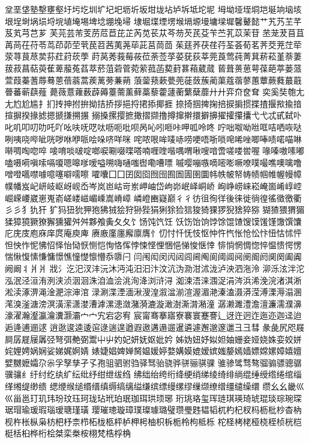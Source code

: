 坌垩垡塾墼壅壑圩圬圪圳圹圮圯坜圻坂坩垅坫垆坼坻坨坭
坶坳垭垤垌垲埏垧垴垓垠埕埘埚埙埒垸埴埯埸埤埝堋堍埽
埭堀堞堙塄堠塥塬墁墉墚墀馨鼙懿艹艽艿芏芊芨芄芎芑芗
芙芫芸芾芰苈苊苣芘芷芮苋苌苁芩芴芡芪芟苄苎芤苡茉苷
苤茏茇苜苴苒苘茌苻苓茑茚茆茔茕苠苕茜荑荛荜茈莒茼茴
茱莛荞茯荏荇荃荟荀茗荠茭茺茳荦荥荨茛荩荬荪荭荮莰荸
莳莴莠莪莓莜莅荼莶莩荽莸荻莘莞莨莺莼菁萁菥菘堇萘萋
菝菽菖萜萸萑萆菔菟萏萃菸菹菪菅菀萦菰菡葜葑葚葙葳蒇
蒈葺蒉葸萼葆葩葶蒌蒎萱葭蓁蓍蓐蓦蒽蓓蓊蒿蒺蓠蒡蒹蒴
蒗蓥蓣蔌甍蔸蓰蔹蔟蔺蕖蔻蓿蓼蕙蕈蕨蕤蕞蕺瞢蕃蕲蕻薤
薨薇薏蕹薮薜薅薹薷薰藓藁藜藿蘧蘅蘩蘖蘼⼶廾弈夼奁耷
奕奚奘匏⼪尢尥尬尴扌扪抟抻拊拚拗拮挢拶挹捋捃掭揶捱
捺掎掴捭掬掊捩掮掼揲揸揠揿揄揞揎摒揆掾摅摁搋搛搠搌
搦搡摞撄摭撖摺撷撸撙撺擀擐擗擤擢攉攥攮⼷弋忒甙弑卟
叱叽叩叨叻吒吖吆呋呒呓呔呖呃吡呗呙吣吲咂咔呷呱呤咚
咛咄呶呦咝哐咭哂咴哒咧咦哓哔呲咣哕咻咿哌哙哚哜咩咪
咤哝哏哞唛哧唠哽唔哳唢唣唏唑唧唪啧喏喵啉啭啁啕唿啐
唼唷啖啵啶啷唳唰啜喋嗒喃喱喹喈喁喟啾嗖喑啻嗟喽喾喔
喙嗪嗷嗉嘟嗑嗫嗬嗔嗦嗝嗄嗯嗥嗲嗳嗌嗍嗨嗵嗤辔嘞嘈嘌
嘁嘤嘣嗾嘀嘧嘭噘嘹噗嘬噍噢噙噜噌噔嚆噤噱噫噻噼嚅嚓
嚯囔⼞囗囝囡囵囫囹囿圄圊圉圜帏帙帔帑帱帻帼帷幄幔幛
幞幡岌屺岍岐岖岈岘岙岑岚岜岵岢岽岬岫岱岣峁岷峄峒峤
峋峥崂崃崧崦崮崤崞崆崛嵘崾崴崽嵬嵛嵯嵝嵫嵋嵊嵩嵴嶂
嶙嶝豳嶷巅⼻彳彷徂徇徉後徕徙徜徨徭徵徼衢⼺彡犭犰犴
犷犸狃狁狎狍狒狨狯狩狲狴狷猁狳猃狺狻猗猓猡猊猞猝猕
猢猹猥猬猸猱獐獍獗獠獬獯獾⾇舛夥飧夤⼡夂饣饧饨饩饪
饫饬饴饷饽馀馄馇馊馍馐馑馓馔馕庀庑庋庖庥庠庹庵庾庳
赓廒廑廛廨廪膺忄忉忖忏怃忮怄忡忤忾怅怆忪忭忸怙怵怦
怛怏怍怩怫怊怿怡恸恹恻恺恂恪恽悖悚悭悝悃悒悌悛惬悻
悱惝惘惆惚悴愠愦愕愣惴愀愎愫慊慵憬憔憧憷懔懵忝隳闩
闫闱闳闵闶闼闾阃阄阆阈阊阋阌阍阏阒阕阖阗阙阚丬⽙爿
戕氵汔汜汊沣沅沐沔沌汨汩汴汶沆沩泐泔沭泷泸泱泗沲泠
泖泺泫泮沱泓泯泾洹洧洌浃浈洇洄洙洎洫浍洮洵洚浏浒浔
洳涑浯涞涠浞涓涔浜浠浼浣渚淇淅淞渎涿淠渑淦淝淙渖涫
渌涮渫湮湎湫溲湟溆湓湔渲渥湄滟溱溘滠漭滢溥溧溽溻溷
滗溴滏溏滂溟潢潆潇漤漕滹漯漶潋潴漪漉漩澉澍澌潸潲潼
潺濑濉澧澹澶濂濡濮濞濠濯瀚瀣瀛瀹瀵灏灞⼧宀宄宕宓宥
宸甯骞搴寤寮褰寰蹇謇辶迓迕迥迮迤迩迦迳迨逅逄逋逦逑
逍逖逡逵逶逭逯遄遑遒遐遨遘遢遛暹遴遽邂邈邃邋⼹彐彗
彖彘尻咫屐屙孱屣屦羼弪弩弭艴弼鬻⼬屮妁妃妍妩妪妣妗
姊妫妞妤姒妲妯姗妾娅娆姝娈姣姘姹娌娉娲娴娑娣娓婀婧
婊婕娼婢婵胬媪媛婷婺媾嫫媲嫒嫔媸嫠嫣嫱嫖嫦嫘嫜嬉嬗
嬖嬲嬷孀尕尜孚孥孳孑孓孢驵驷驸驺驿驽骀骁骅骈骊骐骒
骓骖骘骛骜骝骟骠骢骣骥骧纟纡纣纥纨纩纭纰纾绀绁绂绉
绋绌绐绔绗绛绠绡绨绫绮绯绱绲缍绶绺绻绾缁缂缃缇缈缋
缌缏缑缒缗缙缜缛缟缡缢缣缤缥缦缧缪缫缬缭缯缰缱缲缳
缵⼳幺畿⼮巛甾邕玎玑玮玢玟珏珂珑玷玳珀珉珈珥珙顼琊
珩珧珞玺珲琏琪瑛琦琥琨琰琮琬琛琚瑁瑜瑗瑕瑙瑷瑭瑾璜
璎璀璁璇璋璞璨璩璐璧瓒璺韪韫韬杌杓杞杈杩枥枇杪杳枘
枧杵枨枞枭枋杷杼柰栉柘栊柩枰栌柙枵柚枳柝栀柃枸柢栎
柁柽栲栳桠桡桎桢桄桤梃栝桕桦桁桧桀栾桊桉栩梵梏桴桷
